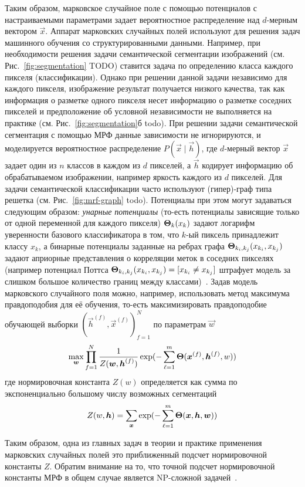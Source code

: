 Таким образом, марковское случайное поле с помощью потенциалов с настраиваемыми параметрами задает вероятностное распределение над $d$-мерным вектором $\vec{x}$. Аппарат марковских случайных полей используют для решения задач машинного обучения со структурированными данными. Например, при необходимости решения задачи семантической сегментации изображений (см. Рис.~\ref{fig:segmentation} \alert{TODO}) ставится задача по определению класса каждого пикселя (классификации). Однако при решении данной задачи независимо для каждого пикселя, изображение результат получается низкого качества, так как информация о разметке одного пикселя несет информацию о разметке соседних пикселей и предположение об условной независимости не выполняется на практике (см. Рис.~\ref{fig:segmentation}б \alert{todo}). При решении задачи семантической сегментация с помощью МРФ данные зависимости не игнорируются, и моделируется вероятностное распределение $P(\vec{x} \mid \vec{h})$, где $d$-мерный вектор $\vec{x}$ задает один из $n$ классов в каждом из $d$ пикселей, а $\vec{h}$ кодирует информацию об обрабатываемом изображении, например яркость каждого из $d$ пикселей. Для задачи семантической классификации часто используют (гипер)-граф типа решетка (см. Рис.~\ref{fig:mrf-graph} \alert{todo}). Потенциалы при этом могут задаваться следующим образом: \emph{унарные потенциалы} (то-есть потенциалы зависящие только от одной переменной для каждого пикселя) $\boldsymbol{\Theta}_k(x_k)$ задают логарифм уверенности базового классификатора в том, что $k$-ый пиксель принадлежит классу $x_k$, а бинарные потенциалы заданные на ребрах графа $\boldsymbol{\Theta}_{k_i, k_j}(x_{k_i}, x_{k_j})$ задают априорные представления о корреляции меток в соседних пикселях (например потенциал Поттса $\boldsymbol{\Theta}_{k_i, k_j}(x_{k_i}, x_{k_j}) = [x_{k_i} \neq x_{k_j}]$ штрафует модель за слишком большое количество границ между классами)~\cite{some mrf segmentaion}. Задав модель марковского случайного поля можно, например, использовать метод максимума правдоподобия для её обучения, то-есть максимизировать правдоподобие обучающей выборки $(\vec{h}^{(f)}, \vec{x}^{(f)})_{f=1}^N$ по параметрам $\vec{w}$
$$
\max_{\boldsymbol{w}} \prod_{f=1}^N \frac{1}{Z(\boldsymbol{w}, \boldsymbol{h}^{(f)})}\exp(-\sum_{\ell=1}^m\boldsymbol{\Theta}(\boldsymbol{x}^{(f)}, \boldsymbol{h}^{(f)}, w))
$$
где нормировочная константа $Z(w)$ определяется как сумма по экспоненциально большому числу возможных сегментаций
$$
Z(w, \boldsymbol{h}) = \sum_{\boldsymbol{x}}\exp(-\sum_{\ell=1}^m\boldsymbol{\Theta}(\boldsymbol{x}, \boldsymbol{h}, \boldsymbol{w}))
$$

Таким образом, одна из главных задач в теории и практике применения марковских случайных полей это приближенный подсчет нормировочной константы $Z$. Обратим внимание на то, что точной подсчет нормировочной константы МРФ в общем случае является NP-сложной задачей~\cite{todo}.

